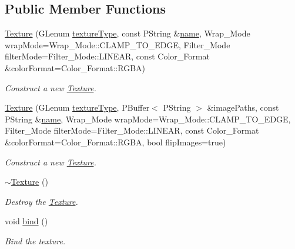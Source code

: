 \subsection*{Public Member Functions}
\begin{DoxyCompactItemize}
\item 
\mbox{\hyperlink{classprz_1_1_texture_af46d7713d680b9771f3a43c552ee7b25}{Texture}} (G\+Lenum \mbox{\hyperlink{classprz_1_1_texture_a3cdf458e7d2adefec6da4cde932cf775}{texture\+Type}}, const P\+String \&\mbox{\hyperlink{classprz_1_1_texture_ad6163bf48f820adc4665d227bcd5c258}{name}}, Wrap\+\_\+\+Mode wrap\+Mode=Wrap\+\_\+\+Mode\+::\+C\+L\+A\+M\+P\+\_\+\+T\+O\+\_\+\+E\+D\+GE, Filter\+\_\+\+Mode filter\+Mode=Filter\+\_\+\+Mode\+::\+L\+I\+N\+E\+AR, const Color\+\_\+\+Format \&color\+Format=Color\+\_\+\+Format\+::\+R\+G\+BA)
\begin{DoxyCompactList}\small\item\em Construct a new \mbox{\hyperlink{classprz_1_1_texture}{Texture}}. \end{DoxyCompactList}\item 
\mbox{\hyperlink{classprz_1_1_texture_a4a11cd4aee54384cd2c9280e8acc926c}{Texture}} (G\+Lenum \mbox{\hyperlink{classprz_1_1_texture_a3cdf458e7d2adefec6da4cde932cf775}{texture\+Type}}, P\+Buffer$<$ P\+String $>$ \&image\+Paths, const P\+String \&\mbox{\hyperlink{classprz_1_1_texture_ad6163bf48f820adc4665d227bcd5c258}{name}}, Wrap\+\_\+\+Mode wrap\+Mode=Wrap\+\_\+\+Mode\+::\+C\+L\+A\+M\+P\+\_\+\+T\+O\+\_\+\+E\+D\+GE, Filter\+\_\+\+Mode filter\+Mode=Filter\+\_\+\+Mode\+::\+L\+I\+N\+E\+AR, const Color\+\_\+\+Format \&color\+Format=Color\+\_\+\+Format\+::\+R\+G\+BA, bool flip\+Images=true)
\begin{DoxyCompactList}\small\item\em Construct a new \mbox{\hyperlink{classprz_1_1_texture}{Texture}}. \end{DoxyCompactList}\item 
\mbox{\hyperlink{classprz_1_1_texture_acf6614dc1ad3a76be4849f519c610110}{$\sim$\+Texture}} ()
\begin{DoxyCompactList}\small\item\em Destroy the \mbox{\hyperlink{classprz_1_1_texture}{Texture}}. \end{DoxyCompactList}\item 
void \mbox{\hyperlink{classprz_1_1_texture_afd48365ad270a9937e9d71c5a371e138}{bind}} ()
\begin{DoxyCompactList}\small\item\em Bind the texture. \end{DoxyCompactList}\item 

\end{DoxyCompactItemize}
